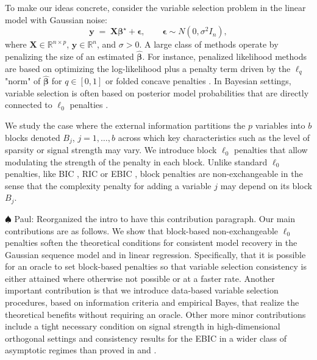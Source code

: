 \documentclass[aos]{imsart}
\theoremstyle{plain}
\newcommand{\paul}[1]{{\small{\color{green} \sf $\spadesuit$ Paul: #1}}}
\newcommand{\R}{\mathbb{R}}
\newcommand{\bs}{\boldsymbol}
\begin{document}
To make our ideas concrete, consider the variable selection problem in the linear model with Gaussian noise:
\begin{equation}\label{eq:linearmodel}
	\bs y \;=\; \bs X \bs \beta^{\star} + \bs\epsilon,\qquad \bs \epsilon \sim N(0,\sigma^2 I_n),
\end{equation}
where $\bs X\in \R^{n\times p}$, $\bs y\in \R^n$, and $\sigma >0$. A large class of methods operate by penalizing the size of an estimated $\hat{\bs  \beta}$. For instance, penalized likelihood methods are based on optimizing the log-likelihood plus a penalty term driven by the $\ell_q$ "norm" of $\hat{\bs  \beta}$ for $q\in [0,1]$ or folded concave penalties \citep{lasso,overviewvarsel,bertsimas}. 
In Bayesian settings, variable selection is often based on posterior model probabilities that are directly connected to $\ell_0$ penalties \citep{BIC,EBIC,rossell2022concentration}. 

We study the case where the external information partitions the $p$ variables into $b$ blocks denoted $B_j$, $j=1,\ldots,b$ across which key characteristics such as the level of sparsity or signal strength may vary. We introduce block $\ell_0$ penalties that allow modulating the strength of the penalty in each block. Unlike standard $\ell_0$ penalties, like BIC \cite{BIC}, RIC \cite{RIC} or EBIC \cite{EBIC}, block penalties are non-exchangeable in the sense that the complexity penalty for adding a variable $j$ may depend on its block $B_j$.

\paul{Reorganized the intro to have this contribution paragraph.}
Our main contributions are as follows. We show that block-based non-exchangeable $\ell_0$ penalties soften
the theoretical conditions for consistent model recovery in the Gaussian sequence model and in linear regression. %
Specifically, %
that it is possible for an oracle to set block-based penalties so that variable selection consistency is either attained where otherwise not possible or at a faster rate. Another important contribution is that we introduce data-based variable selection procedures, %
based on information criteria and empirical Bayes, that realize the theoretical benefits without requiring an oracle. Other more minor contributions include a tight necessary condition on signal strength in high-dimensional orthogonal settings and consistency results for the EBIC in a wider class of asymptotic regimes than proved in \cite{EBIC} and \cite{ebicdiverging}.
\end{document}
